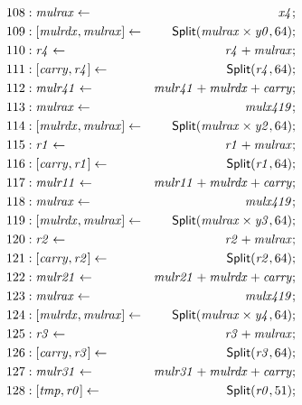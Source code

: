 {\begin{multicols}{2}
\begin{align*}
108 &: \mathit{mulrax} \leftarrow & \mathit{x4}; \\
109 &: \concat{\mathit{mulrdx}}{\mathit{mulrax}} \leftarrow & \dslcode{Split}(\mathit{mulrax} \times \mathit{y0}, 64); \\
110 &: \mathit{r4} \leftarrow & \mathit{r4} + \mathit{mulrax}; \\
111 &: \concat{\mathit{carry}}{\mathit{r4}} \leftarrow & \dslcode{Split}(\mathit{r4}, 64); \\
112 &: \mathit{mulr41} \leftarrow & \mathit{mulr41} + \mathit{mulrdx} + \mathit{carry}; \\
113 &: \mathit{mulrax} \leftarrow & \mathit{mulx419}; \\
114 &: \concat{\mathit{mulrdx}}{\mathit{mulrax}} \leftarrow & \dslcode{Split}(\mathit{mulrax} \times \mathit{y2}, 64); \\
115 &: \mathit{r1} \leftarrow & \mathit{r1} + \mathit{mulrax}; \\
116 &: \concat{\mathit{carry}}{\mathit{r1}} \leftarrow & \dslcode{Split}(\mathit{r1}, 64); \\
117 &: \mathit{mulr11} \leftarrow & \mathit{mulr11} + \mathit{mulrdx} + \mathit{carry}; \\
118 &: \mathit{mulrax} \leftarrow & \mathit{mulx419}; \\
119 &: \concat{\mathit{mulrdx}}{\mathit{mulrax}} \leftarrow & \dslcode{Split}(\mathit{mulrax} \times \mathit{y3}, 64); \\
120 &: \mathit{r2} \leftarrow & \mathit{r2} + \mathit{mulrax}; \\
121 &: \concat{\mathit{carry}}{\mathit{r2}} \leftarrow & \dslcode{Split}(\mathit{r2}, 64); \\
122 &: \mathit{mulr21} \leftarrow & \mathit{mulr21} + \mathit{mulrdx} + \mathit{carry}; \\
123 &: \mathit{mulrax} \leftarrow & \mathit{mulx419}; \\
124 &: \concat{\mathit{mulrdx}}{\mathit{mulrax}} \leftarrow & \dslcode{Split}(\mathit{mulrax} \times \mathit{y4}, 64); \\
125 &: \mathit{r3} \leftarrow & \mathit{r3} + \mathit{mulrax}; \\
126 &: \concat{\mathit{carry}}{\mathit{r3}} \leftarrow & \dslcode{Split}(\mathit{r3}, 64); \\
127 &: \mathit{mulr31} \leftarrow & \mathit{mulr31} + \mathit{mulrdx} + \mathit{carry}; \\
128 &: \concat{\mathit{tmp}}{\mathit{r0}} \leftarrow & \dslcode{Split}(\mathit{r0}, 51); \\

\end{align*}
\end{multicols}}
